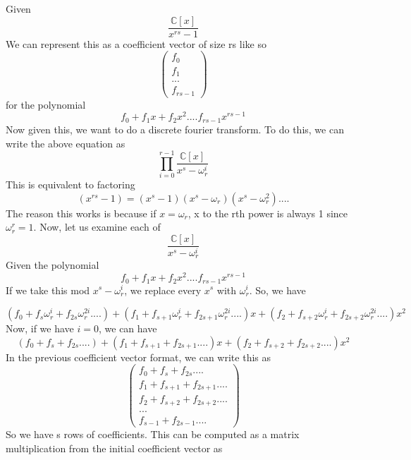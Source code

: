 \documentclass{article}
\begin{document}
	Given
	\begin{equation}
		\dfrac{\mathbb{C}[x]}{x^{rs}-1}
	\end{equation}
	We can represent this as a coefficient vector of size rs like so
	\begin{equation}
		\begin{pmatrix}
			f_0 \\
			f_1 \\
			... \\
			f_{rs-1}
		\end{pmatrix}
	\end{equation}
	for the polynomial
	\begin{equation}
		f_0+f_1x+f_2x^2....f_{rs-1}x^{rs-1}
	\end{equation}
	Now given this, we want to do a discrete fourier transform. To do this, we can write the above equation as
	\begin{equation}
		\prod^{r-1}_{i=0}\dfrac{\mathbb{C}[x]}{x^{s}-\omega_r^i}
	\end{equation}
	This is equivalent to factoring
	\begin{equation}
		(x^{rs}-1)=(x^s-1)(x^s-\omega_r)(x^s-\omega_r^2)....
	\end{equation}
	The reason this works is because if $x=\omega_r$, x to the rth power is always 1 since $\omega_r^r=1$. Now, let us examine each of
	\begin{equation}
		\dfrac{\mathbb{C}[x]}{x^{s}-\omega_r^i}
	\end{equation}
	Given the polynomial
	\begin{equation}
		f_0+f_1x+f_2x^2....f_{rs-1}x^{rs-1}
	\end{equation}
	If we take this mod $x^{s}-\omega_r^i$, we replace every $x^s$ with $\omega_r^i$. So, we have
	
	\begin{equation}
		(f_0+f_s\omega_r^i+f_{2s}\omega_r^{2i}....) + (f_1+f_{s+1}\omega_r^i+f_{2s+1}\omega_r^{2i}....)x +
		(f_2+f_{s+2}\omega_r^i+f_{2s+2}\omega_r^{2i}....)x^2
	\end{equation}
	Now, if we have $i=0$, we can have
	\begin{equation}
		(f_0+f_s+f_{2s}....) + (f_1+f_{s+1}+f_{2s+1}....)x +
		(f_2+f_{s+2}+f_{2s+2}....)x^2
	\end{equation}
	In the previous coefficient vector format, we can write this as
	\begin{equation}
		\begin{pmatrix}
			f_0+f_s+f_{2s}.... \\
			f_1+f_{s+1}+f_{2s+1}....\\
			f_2+f_{s+2}+f_{2s+2}....\\
			... \\
			f_{s-1}+f_{2s-1}....
		\end{pmatrix}
	\end{equation}
	So we have s rows of coefficients. This can be computed as a matrix multiplication from the initial coefficient vector as
	
\end{document}
